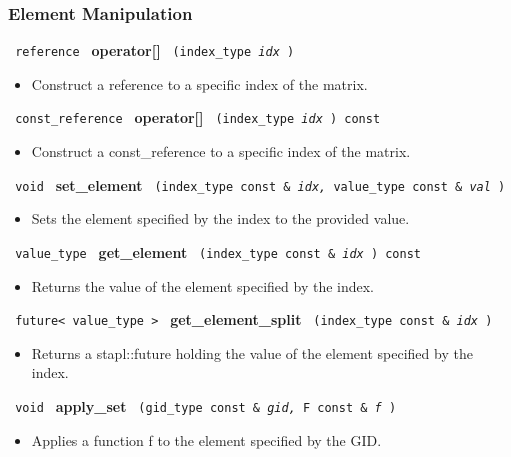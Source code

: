 \subsubsection{Element Manipulation}

\noindent
\texttt{%
reference
}
\textbf{operator[]}%
\texttt{%
(index\_type 
\textit{idx}%
)
}

\begin{itemize}
\item
Construct a reference to a specific index of the matrix.
\end{itemize}
 
\noindent%
\texttt{%
const\_reference
}
\textbf{operator[]}%
\texttt{%
(index\_type 
\textit{idx}%
) const
}

\begin{itemize}
\item
Construct a const\_reference to a specific index of the matrix.
\end{itemize}
 
\noindent
\texttt{%
void
}
\textbf{set\_element}%
\texttt{%
(index\_type const \&
\textit{idx,}%
value\_type const \&
\textit{val}%
)
}

\begin{itemize}
\item
Sets the element specified by the index to the provided value.
\end{itemize}
 
\noindent
\texttt{%
value\_type
}
\textbf{get\_element}%
\texttt{%
(index\_type const \&
\textit{idx}%
) const
}

\begin{itemize}
\item
Returns the value of the element specified by the index.
\end{itemize}
 
\noindent
\texttt{%
future< value\_type >
}
\textbf{get\_element\_split}%
\texttt{%
(index\_type const \&
\textit{idx}%
)
}

\begin{itemize}
\item
Returns a stapl::future holding the value of the element specified by the index.
\end{itemize}
 
\noindent
\texttt{%
void
}
\textbf{apply\_set}%
\texttt{%
(gid\_type const \&
\textit{gid,}%
F const \&
\textit{f}%
)
}

\begin{itemize}
\item
Applies a function f to the element specified by the GID.
\end{itemize}
 
